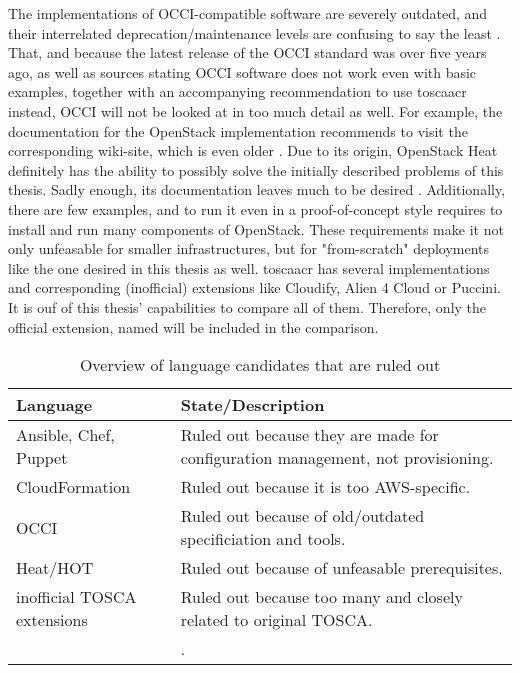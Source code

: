 \newline
The implementations of OCCI-compatible software are severely outdated, and their interrelated deprecation/maintenance levels are confusing to say the least \cite{occi_openstack} \cite{occi-opennebula} \cite{github_tmetsch_occi_os} \cite{github_stackforge_occi_os}.
That, and because the latest release of the OCCI standard was over five years ago, as well as sources stating OCCI software does not work even with basic examples, together with an accompanying recommendation to use \gls{toscaacr} instead, %
OCCI will not be looked at in too much detail as well. For example, the documentation for the OpenStack implementation \cite{occi_openstack} recommends to visit the corresponding wiki-site, which is even older \cite{openstack_occi}.
\newline
Due to its origin, OpenStack Heat definitely has the ability to possibly solve the initially described problems of this thesis. Sadly enough, its documentation leaves much to be desired \cite{openstack_heat}. Additionally, there are few examples, and to run it even in a proof-of-concept style requires to install and run many components of OpenStack. These requirements make it not only unfeasable for smaller infrastructures, but for "from-scratch" deployments like the one desired in this thesis as well.
\newline
\Gls{toscaacr} has several implementations and corresponding (inofficial) extensions like Cloudify, Alien 4 Cloud or Puccini. It is ouf of this thesis' capabilities to compare all of them. Therefore, only the official extension, named  will be included in the comparison.

\begin{table}[H]
  \caption{Overview of language candidates that are ruled out}
  \begin{tabular}{ | l | l | }
    \hline
    Language & State/Description \\
    \hline
    Ansible, Chef, Puppet & Ruled out because they are made for configuration management, not provisioning. \\
    CloudFormation & Ruled out because it is too AWS-specific. \\
    OCCI & Ruled out because of old/outdated specificiation and tools. \\
    Heat/HOT & Ruled out because of unfeasable prerequisites. \\
    inofficial TOSCA extensions & Ruled out because too many and closely related to original TOSCA. \\
    \hline & . \\
  \end{tabular}
  \label{tab:afterculling}
\end{table}

